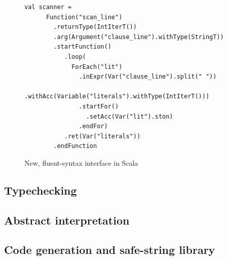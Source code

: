 \documentclass[letterpaper]{article}
\begin{document}
\begin{figure}[h]
    \begin{lstlisting}
val scanner = 
      Function("scan_line")
        .returnType(IntIterT())
        .arg(Argument("clause_line").withType(StringT))
        .startFunction()
           .loop(
             ForEach("lit")
               .inExpr(Var("clause_line").split(" "))
               .withAcc(Variable("literals").withType(IntIterT()))
               .startFor()
                 .setAcc(Var("lit").ston)
               .endFor)
           .ret(Var("literals"))
        .endFunction
    \end{lstlisting}
  \caption{New, fluent-syntax interface in Scala}
    \label{fig:fluentsyntax}
\end{figure}

\subsection{Typechecking}
\subsection{Abstract interpretation}
\subsection{Code generation and safe-string library}

\end{document}
